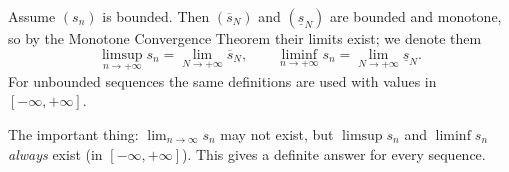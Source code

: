 \documentclass[11pt]{report}
\begin{document}
\begin{defbox}
Assume $(s_n)$ is bounded. Then $(\overline{s}_N)$ and $(\underline{s}_N)$ are bounded and monotone, so by the Monotone Convergence Theorem their limits exist; we denote them
\[
\limsup_{n \to +\infty} s_n = \lim_{N \to +\infty} \overline{s}_N, \qquad \liminf_{n \to +\infty} s_n = \lim_{N \to +\infty} \underline{s}_N.
\]
For unbounded sequences the same definitions are used with values in $[-\infty, +\infty]$.
\end{defbox}

\begin{rembox}
The important thing: $\lim_{n\to\infty} s_n$ may not exist, but $\limsup s_n$ and $\liminf s_n$ \emph{always} exist (in $[-\infty,+\infty]$). This gives a definite answer for every sequence.
\end{rembox}
\end{document}
